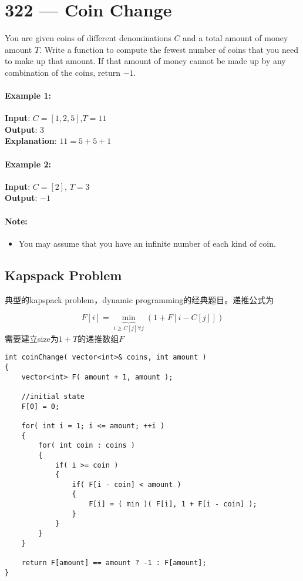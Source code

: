 \section{322 --- Coin Change}
You are given coins of different denominations $C$ and a total amount of money amount $T$. Write a function to compute the fewest number of coins that you need to make up that amount. If that amount of money cannot be made up by any combination of the coins, return $-1$.

\paragraph{Example 1:}

\begin{flushleft}
\textbf{Input}: $C = [1, 2, 5]$,\quad $T = 11$
\\
\textbf{Output}: 3 
\\
\textbf{Explanation}: $ 11 = 5 + 5 + 1 $
\end{flushleft}

\paragraph{Example 2:}

\begin{flushleft}
\textbf{Input}: $C = [2]$, \quad $T = 3$
\\
\textbf{Output}: $ -1 $
\end{flushleft}

\paragraph{Note:}
\begin{itemize}
\item You may assume that you have an infinite number of each kind of coin.
\end{itemize}
\subsection{Kapspack Problem}
典型的kapspack problem，dynamic programming的经典题目。递推公式为

\[
F[i] = \underbrace{\min}_{i \geq C[j]\forall j}(1+F[i-C[j]])
\]
需要建立size为$ 1+T $的递推数组$F$

\setcounter{lstlisting}{0}
\begin{lstlisting}[style=customc, caption={Dynamic Programming}]
int coinChange( vector<int>& coins, int amount )
{
    vector<int> F( amount + 1, amount );

	//initial state
    F[0] = 0;
    
    for( int i = 1; i <= amount; ++i )
    {
        for( int coin : coins )
        {
            if( i >= coin )
            {
                if( F[i - coin] < amount )
                {
                    F[i] = ( min )( F[i], 1 + F[i - coin] );
                }
            }
        }
    }

    return F[amount] == amount ? -1 : F[amount];
}
\end{lstlisting}